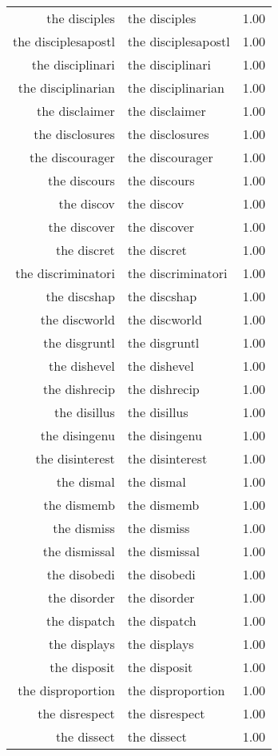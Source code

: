 \begin{table}[ht]
\begin{tabular}{rlr}
  the disciples & the disciples & 1.00 \\ 
  the disciplesapostl & the disciplesapostl & 1.00 \\ 
  the disciplinari & the disciplinari & 1.00 \\ 
  the disciplinarian & the disciplinarian & 1.00 \\ 
  the disclaimer & the disclaimer & 1.00 \\ 
  the disclosures & the disclosures & 1.00 \\ 
  the discourager & the discourager & 1.00 \\ 
  the discours & the discours & 1.00 \\ 
  the discov & the discov & 1.00 \\ 
  the discover & the discover & 1.00 \\ 
  the discret & the discret & 1.00 \\ 
  the discriminatori & the discriminatori & 1.00 \\ 
  the discshap & the discshap & 1.00 \\ 
  the discworld & the discworld & 1.00 \\ 
  the disgruntl & the disgruntl & 1.00 \\ 
  the dishevel & the dishevel & 1.00 \\ 
  the dishrecip & the dishrecip & 1.00 \\ 
  the disillus & the disillus & 1.00 \\ 
  the disingenu & the disingenu & 1.00 \\ 
  the disinterest & the disinterest & 1.00 \\ 
  the dismal & the dismal & 1.00 \\ 
  the dismemb & the dismemb & 1.00 \\ 
  the dismiss & the dismiss & 1.00 \\ 
  the dismissal & the dismissal & 1.00 \\ 
  the disobedi & the disobedi & 1.00 \\ 
  the disorder & the disorder & 1.00 \\ 
  the dispatch & the dispatch & 1.00 \\ 
  the displays & the displays & 1.00 \\ 
  the disposit & the disposit & 1.00 \\ 
  the disproportion & the disproportion & 1.00 \\ 
  the disrespect & the disrespect & 1.00 \\ 
  the dissect & the dissect & 1.00 \\ 

\end{tabular}
\end{table}
